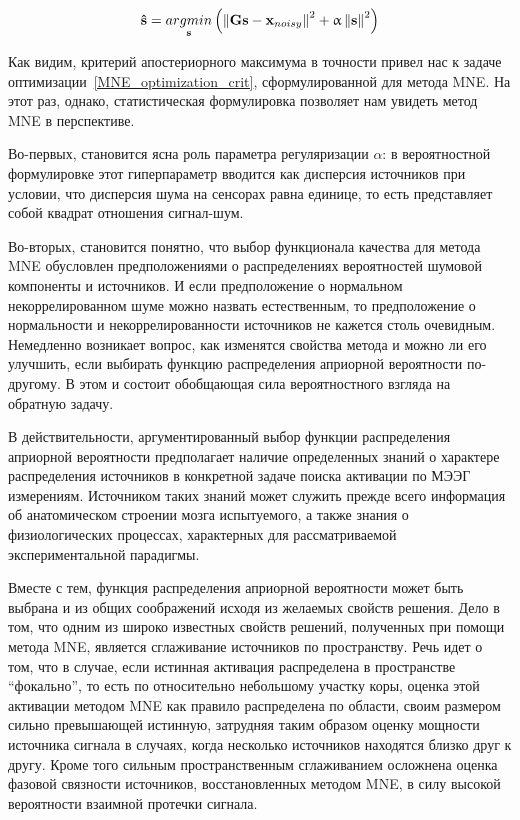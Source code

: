 \begin{equation}
    \mathbf{\hat{s}} =
    \underset{\mathbf{s}}{argmin} \left(
        \left\lVert\mathbf{Gs - x}_{noisy}\right\rVert^2 + \upalpha\left\lVert\mathbf{s}\right\rVert^2
    \right)
    \label{logMAP_crit_for_MNE}
\end{equation}

Как видим, критерий апостериорного максимума в точности привел нас
к задаче оптимизации~\ref{MNE_optimization_crit}, сформулированной для
метода MNE. На этот раз, однако, статистическая формулировка позволяет
нам увидеть метод MNE в перспективе.

Во-первых, становится ясна роль параметра регуляризации $\alpha$:
в вероятностной формулировке этот гиперпараметр вводится как дисперсия
источников при условии, что дисперсия шума на сенсорах равна единице,
то есть представляет собой квадрат отношения сигнал-шум.

Во-вторых, становится понятно, что выбор функционала качества для метода MNE
обусловлен предположениями о распределениях вероятностей шумовой компоненты и
источников. И если предположение о нормальном некоррелированном шуме можно
назвать естественным, то предположение о нормальности и некоррелированности
источников не кажется столь очевидным.  Немедленно возникает вопрос, как
изменятся свойства метода и можно ли его улучшить, если выбирать функцию
распределения априорной вероятности по-другому. В этом и состоит обобщающая
сила вероятностного взгляда на обратную задачу.

В действительности, аргументированный выбор функции распределения априорной
вероятности предполагает наличие определенных знаний о характере распределения
источников в конкретной задаче поиска активации по МЭЭГ измерениям. Источником
таких знаний может служить прежде всего информация об анатомическом строении
мозга испытуемого, а также знания о физиологических процессах, характерных для
рассматриваемой экспериментальной парадигмы.

Вместе с тем, функция распределения априорной вероятности может быть выбрана и из
общих соображений исходя из желаемых свойств решения. Дело в том, что одним из
широко известных свойств решений, полученных при помощи метода MNE, является
сглаживание источников по пространству. Речь идет о том, что в случае,
если истинная активация распределена в пространстве ``фокально'', то есть
по относительно небольшому участку коры, оценка этой активации методом
MNE как правило распределена по области, своим размером сильно превышающей
истинную, затрудняя таким образом оценку мощности источника сигнала в
случаях, когда несколько источников находятся близко друг к другу.
Кроме того сильным пространственным сглаживанием осложнена оценка фазовой
связности источников, восстановленных методом MNE, в силу высокой вероятности
взаимной протечки сигнала.

